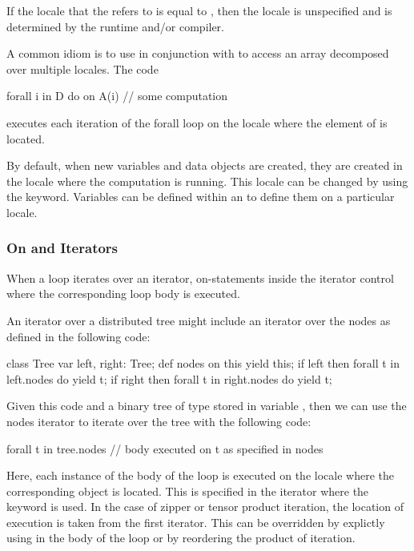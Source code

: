 If the locale that the  refers to is equal
to , then the locale is unspecified and is determined by
the runtime and/or compiler.

\begin{example}
A common idiom is to use  in conjunction with 
to access an array decomposed over multiple locales.  The code
\begin{chapel}
forall i in D do on A(i) {
  // some computation
}
\end{chapel}
executes each iteration of the forall loop on the locale where the
element of  is located.
\end{example}

By default, when new variables and data objects are created, they are
created in the locale where the computation is running.  This locale
can be changed by using the  keyword.  Variables can be
defined within an  to define them on a particular
locale.

\subsubsection{On and Iterators}
\label{On_and_Iterators}

When a loop iterates over an iterator, on-statements inside the
iterator control where the corresponding loop body is executed.

\begin{example}
An iterator over a distributed tree might include an iterator over the
nodes as defined in the following code:
\begin{chapel}
class Tree {
  var left, right: Tree;
  def nodes {
    on this yield this;
    if left then
      forall t in left.nodes do
        yield t;
    if right then
      forall t in right.nodes do
        yield t;
  }
}
\end{chapel}
Given this code and a binary tree of type  stored in
variable , then we can use the nodes iterator to iterate
over the tree with the following code:
\begin{chapel}
forall t in tree.nodes {
  // body executed on t as specified in nodes
}
\end{chapel}
Here, each instance of the body of the  loop is executed
on the locale where the corresponding object  is located.
This is specified in the  iterator where the 
keyword is used.  In the case of zipper or tensor product iteration,
the location of execution is taken from the first iterator.  This can
be overridden by explictly using  in the body of the loop or
by reordering the product of iteration.
\end{example}

